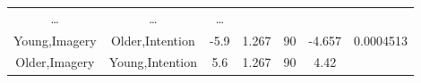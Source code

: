\documentclass[]{article}
\theoremstyle{definition}
\theoremstyle{definition}
\theoremstyle{definition}
\theoremstyle{remark}
\begin{document}
\begin{longtable}[]{@{}ccccccc@{}}
\begin{minipage}[t]{0.05\columnwidth}
\ldots{}\strut
\end{minipage} & \begin{minipage}[t]{0.11\columnwidth}\centering\strut
\ldots{}\strut
\end{minipage} & \begin{minipage}[t]{0.11\columnwidth}\centering\strut
\ldots{}\strut
\end{minipage}\tabularnewline
\begin{minipage}[t]{0.16\columnwidth}\centering\strut
Young,Imagery\strut
\end{minipage} & \begin{minipage}[t]{0.16\columnwidth}\centering\strut
Older,Intention\strut
\end{minipage} & \begin{minipage}[t]{0.10\columnwidth}\centering\strut
-5.9\strut
\end{minipage} & \begin{minipage}[t]{0.11\columnwidth}\centering\strut
1.267\strut
\end{minipage} & \begin{minipage}[t]{0.05\columnwidth}\centering\strut
90\strut
\end{minipage} & \begin{minipage}[t]{0.11\columnwidth}\centering\strut
-4.657\strut
\end{minipage} & \begin{minipage}[t]{0.11\columnwidth}\centering\strut
0.0004513\strut
\end{minipage}\tabularnewline
\begin{minipage}[t]{0.16\columnwidth}\centering\strut
Older,Imagery\strut
\end{minipage} & \begin{minipage}[t]{0.16\columnwidth}\centering\strut
Young,Intention\strut
\end{minipage} & \begin{minipage}[t]{0.10\columnwidth}\centering\strut
5.6\strut
\end{minipage} & \begin{minipage}[t]{0.11\columnwidth}\centering\strut
1.267\strut
\end{minipage} & \begin{minipage}[t]{0.05\columnwidth}\centering\strut
90\strut
\end{minipage} & \begin{minipage}[t]{0.11\columnwidth}\centering\strut
4.42\strut
\end{minipage} & \begin{minipage}[t]{0.11\columnwidth}\centering\strut

\end{minipage}
\end{longtable}
\end{document}
